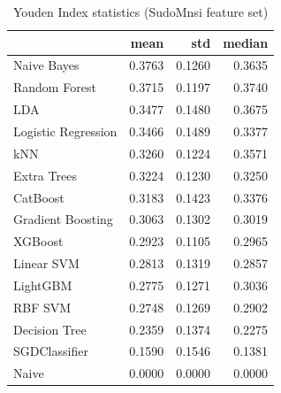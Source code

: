 \begin{table}
\caption{Youden Index statistics (SudoMnsi feature set)}
\label{tab:youden_SudoMnsi_stats}
\begin{tabular}{lrrr}
\toprule
 & mean & std & median \\
\midrule
Naive Bayes & 0.3763 & 0.1260 & 0.3635 \\
Random Forest & 0.3715 & 0.1197 & 0.3740 \\
LDA & 0.3477 & 0.1480 & 0.3675 \\
Logistic Regression & 0.3466 & 0.1489 & 0.3377 \\
kNN & 0.3260 & 0.1224 & 0.3571 \\
Extra Trees & 0.3224 & 0.1230 & 0.3250 \\
CatBoost & 0.3183 & 0.1423 & 0.3376 \\
Gradient Boosting & 0.3063 & 0.1302 & 0.3019 \\
XGBoost & 0.2923 & 0.1105 & 0.2965 \\
Linear SVM & 0.2813 & 0.1319 & 0.2857 \\
LightGBM & 0.2775 & 0.1271 & 0.3036 \\
RBF SVM & 0.2748 & 0.1269 & 0.2902 \\
Decision Tree & 0.2359 & 0.1374 & 0.2275 \\
SGDClassifier & 0.1590 & 0.1546 & 0.1381 \\
Naive & 0.0000 & 0.0000 & 0.0000 \\
\bottomrule
\end{tabular}
\end{table}
